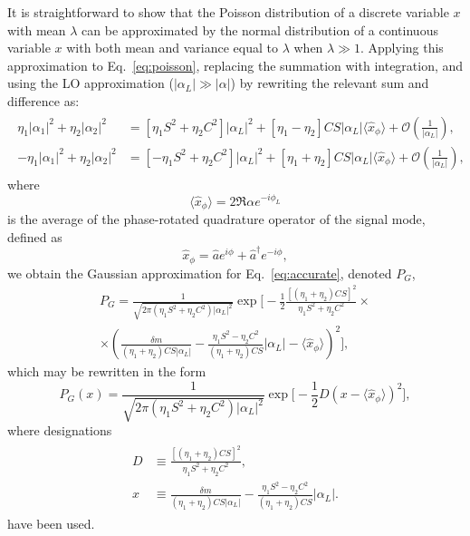 It is straightforward to show that the Poisson distribution of a discrete variable $x$ with mean $\lambda$ can be approximated by the normal distribution of a continuous variable $x$ with both mean and variance equal to $\lambda$ when $\lambda \gg 1$. Applying this approximation to Eq.{~\eqref{eq:poisson}}, replacing the summation with integration, and using the LO approximation ($|\alpha_L|\gg|\alpha|$) by rewriting the relevant sum and difference as:
\begin{align}
\begin{split}
\eta_1|\alpha_1|^2+\eta_2|\alpha_2|^2&=\left[\eta_1S^2+\eta_2C^2\right]|\alpha_L|^2+\left[\eta_1-\eta_2\right]CS|\alpha_L|\langle\hat{x}_\phi\rangle+{\mathcal{O}}\left(\frac{1}{|\alpha_L|}\right),\\
-\eta_1|\alpha_1|^2+\eta_2|\alpha_2|^2&=\left[-\eta_1S^2+\eta_2C^2\right]|\alpha_L|^2+\left[\eta_1+\eta_2\right]CS|\alpha_L|\langle\hat{x}_\phi\rangle+{\mathcal{O}}\left(\frac{1}{|\alpha_L|}\right),
\end{split}
\label{eq:small-o}
\end{align}
where
\begin{equation}
    \langle\hat{x}_\phi\rangle={2\Re\alpha e^{-i\phi_L}}
\end{equation}
is the average of the phase-rotated quadrature operator of the signal
mode, defined as
\begin{equation}
\hat{x}_\phi=\hat{a}e^{i\phi}+\hat{a}^\dag e^{-i\phi},
    \label{eq:quad-op}
\end{equation}
we obtain the Gaussian approximation for Eq.~\eqref{eq:accurate}, denoted $P_G$,
\begin{multline}
    P_G=\frac{1}{\sqrt{2\pi(\eta_1S^2+\eta_2C^2)|\alpha_L|^2}}
    \exp \biggl[-\frac{1}{2}\frac{
\left[\left(\eta_1+\eta_2\right)CS\right]^2}
{\eta_1S^2+\eta_2C^2}
\times\\\times
{\left(\frac{\delta m}{(\eta_1+\eta_2)CS|\alpha_L|}-\frac{\eta_1S^2-\eta_2C^2}{\left(\eta_1+\eta_2\right)CS}|\alpha_L|-\langle\hat{x}_\phi\rangle\right)^2}\biggr],\label{eq:Pgood}
\end{multline}
which may be rewritten in the form
\begin{equation}
{P}_G(x)=\frac{1}{\sqrt{2\pi(\eta_1S^2+\eta_2C^2)|\alpha_L|^2}}
    \exp \biggl[-\frac{1}{2}D{\left(x-\langle\hat{x}_\phi\rangle\right)^2}\biggr],
    \label{eq:Pgood-w-def}
\end{equation}
where designations
\begin{align}
    \begin{split}
        D&\equiv\frac{
\left[\left(\eta_1+\eta_2\right)CS\right]^2}{\eta_1S^2+\eta_2C^2},\\x&\equiv\frac{\delta m}{(\eta_1+\eta_2)CS|\alpha_L|}-\frac{\eta_1S^2-\eta_2C^2}{\left(\eta_1+\eta_2\right)CS}|\alpha_L|.
    \end{split}
    \label{eq:defs-x-D}
\end{align}
have been used. 

